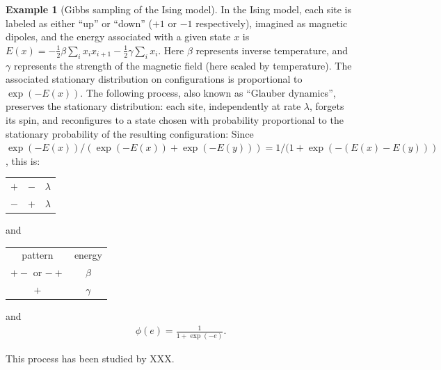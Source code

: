 \documentclass{article}
\theoremstyle{plain}
\theoremstyle{definition}
\newtheorem{example}{Example}[section]
\begin{document}
\begin{example}[Gibbs sampling of the Ising model]
    In the Ising model, each site is labeled as either ``up'' or ``down'' ($+1$ or $-1$ respectively),
    imagined as magnetic dipoles,
    and the energy associated with a given state $x$ is $E(x) = - \frac{1}{2} \beta \sum_i x_i x_{i+1} - \frac{1}{2} \gamma \sum_i x_i$.
    Here $\beta$ represents inverse temperature, and $\gamma$ represents the strength of the magnetic field (here scaled by temperature).
    The associated stationary distribution on configurations is proportional to $\exp(-E(x))$.
    The following process, also known as ``Glauber dynamics'', preserves the stationary distribution:
    each site, independently at rate $\lambda$,
    forgets its spin,
    and reconfigures to a state chosen with probability proportional to the stationary probability of the resulting configuration:
    Since $\exp(-E(x))/(\exp(-E(x))+\exp(-E(y))) = 1/(1+\exp(-(E(x)-E(y)))$,
    this is:
    \begin{center}
        \begin{tabular}{c@{\quad$\to$\quad}c@{\quad at rate\quad }c}
          $+$  &   $-$   &  $\lambda$ \\
          $-$  &   $+$   &  $\lambda$
        \end{tabular}
        \qquad and \qquad
        \begin{tabular}{cc}
        pattern  &  energy \\
        $+-$ or $-+$  &   $\beta$ \\
        $+$ &   $\gamma$
        \end{tabular}
    \end{center}
    and
    \begin{align*}
        \phi(e) = \frac{1}{1+\exp(-e)} .
    \end{align*}

    This process has been studied by XXX.
\end{example}
\end{document}
